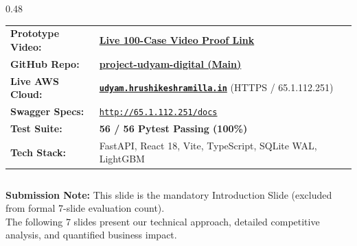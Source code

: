 \documentclass[aspectratio=169,10pt]{beamer}
\begin{document}
\begin{frame}[plain]
\begin{columns}[T]
    \begin{column}{0.48\textwidth}
      \begin{tcolorbox}[accentbox, title={\fontsize{7pt}{8.5pt}\selectfont\textbf{\textcolor{charcoal}{Live Production Deliverables \& Video Walkthrough}}}, coltitle=charcoal]
        {\fontsize{5.8pt}{7.2pt}\selectfont
        \begin{tabularx}{\linewidth}{p{2.2cm}X}
          \textbf{Prototype Video:} & \href{http://65.1.112.251/audit/audit_dashboard.html}{\textcolor{airtelred}{\textbf{Live 100-Case Video Proof Link}}} \\
          \textbf{GitHub Repo:} & \href{https://github.com/Hrushikesh-ramilla/project-udyam-digital}{\textcolor{airtelred}{\textbf{project-udyam-digital (Main)}}} \\
          \textbf{Live AWS Cloud:} & \href{https://udyam.hrushikeshramilla.in}{\textcolor{airtelred}{\textbf{\texttt{udyam.hrushikeshramilla.in}}}} (HTTPS / 65.1.112.251) \\
          \textbf{Swagger Specs:} & \href{http://65.1.112.251/docs}{\textcolor{airtelred}{\texttt{http://65.1.112.251/docs}}} \\
          \textbf{Test Suite:} & \textcolor{successgreen}{\textbf{56 / 56 Pytest Passing (100\%)}} \\
          \textbf{Tech Stack:} & FastAPI, React 18, Vite, TypeScript, SQLite WAL, LightGBM \\
        \end{tabularx}
        }
      \end{tcolorbox}
    \end{column}
  \end{columns}

  \vspace{0.25cm}
  \begin{center}
    {\fontsize{6.2pt}{7.5pt}\selectfont
    \textbf{Submission Note:} This slide is the mandatory Introduction Slide (excluded from formal 7-slide evaluation count). \\
    The following 7 slides present our technical approach, detailed competitive analysis, and quantified business impact.
    }
  \end{center}
\end{frame}
\end{document}
